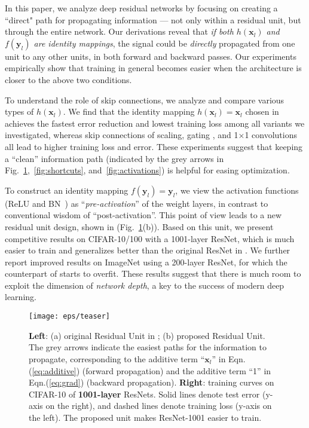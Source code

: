\documentclass[runningheads]{llncs}
\newcommand{\ve}[1]{\mathbf{#1}} \newcommand{\ma}[1]{\mathrm{#1}}
\begin{document}
In this paper, we analyze deep residual networks by focusing on creating a ``direct" path for propagating information --- not only within a residual unit, but through the entire network. Our derivations reveal that \emph{if both $h(\ve{x}_{l})$ and $f(\ve{y}_{l})$ are identity mappings}, the signal could be \emph{directly} propagated from one unit to any other units, in both forward and backward passes. Our experiments empirically show that training in general becomes easier when the architecture is closer to the above two conditions.

To understand the role of skip connections, we analyze and compare various types of $h(\ve{x}_{l})$. We find that the identity mapping $h(\ve{x}_{l}) = \ve{x}_{l}$ chosen in \cite{He2016} achieves the fastest error reduction and lowest training loss among all variants we investigated, whereas skip connections of scaling, gating \cite{Hochreiter1997,Srivastava2015,Srivastava2015a}, and 1$\times$1 convolutions all lead to higher training loss and error. These experiments suggest that keeping a ``clean'' information path (indicated by the grey arrows in Fig.~\ref{fig:teaser},~\ref{fig:shortcuts}, and~\ref{fig:activations}) is helpful for easing optimization.

To construct an identity mapping $f(\ve{y}_{l})=\ve{y}_{l}$, we view the activation functions (ReLU and BN~\cite{Ioffe2015}) as ``\emph{pre-activation}'' of the weight layers, in contrast to conventional wisdom of ``post-activation''. This point of view leads to a new residual unit design, shown in (Fig.~\ref{fig:teaser}(b)). Based on this unit, we present competitive results on CIFAR-10/100 with a 1001-layer ResNet, which is much easier to train and generalizes better than the original ResNet in \cite{He2016}. We further report improved results on ImageNet using a 200-layer ResNet, for which the counterpart of \cite{He2016} starts to overfit. These results suggest that there is much room to exploit the dimension of \emph{network depth}, a key to the success of modern deep learning.


\begin{figure}[t]
\centering
\texttt{[image: eps/teaser]}
\caption{\textbf{Left}: (a) original Residual Unit in \cite{He2016}; (b) proposed Residual Unit. The grey arrows indicate the easiest paths for the information to propagate, corresponding to the additive term ``$\ve{x}_l$'' in Eqn.(\ref{eq:additive}) (forward propagation) and the additive term ``1'' in Eqn.(\ref{eq:grad}) (backward propagation). \textbf{Right}: training curves on CIFAR-10 of \textbf{1001-layer} ResNets. Solid lines denote test error (y-axis on the right), and dashed lines denote training loss (y-axis on the left). The proposed unit makes ResNet-1001 easier to train.}
\label{fig:teaser}
\end{figure}
\end{document}
